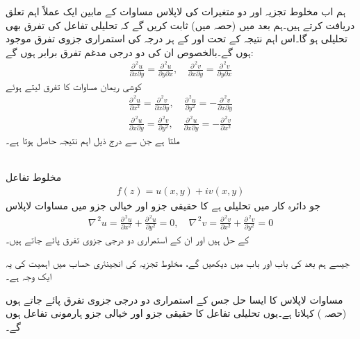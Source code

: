 ہم اب مخلوط تجزیہ اور دو متغیرات کی لاپلاس مساوات کے مابین ایک عملاً اہم تعلق دریافت کرتے ہیں۔ہم بعد میں (حصہ  میں)  ثابت کریں گے کہ تحلیلی تفاعل  کی تفرق بھی تحلیلی ہو گا۔اس اہم نتیجہ کے تحت  اور  کے ہر درجہ کی استمراری جزوی تفرق موجود ہوں گے۔بالخصوص ان کی دو درجی مدغم تفرق برابر ہوں گے:
\begin{align*}
\frac{\partial^{\,2}u}{\partial x\partial y}=\frac{\partial^{\,2}u}{\partial y\partial x},\quad\frac{\partial^{\,2}v}{\partial x\partial y}=\frac{\partial^{\,2}v}{\partial y\partial x}
\end{align*}
کوشی ریمان مساوات کا تفرق لیتے ہوئے
\begin{align*}
\frac{\partial^{\,2}u}{\partial x^2}=\frac{\partial^{\,2}v}{\partial x\partial y},\quad \frac{\partial^{\,2}u}{\partial y^2}=-\frac{\partial^{\,2}v}{\partial x\partial y}\\
\frac{\partial^{\,2}u}{\partial x\partial y}=\frac{\partial^{\,2}v}{\partial y^2},\quad \frac{\partial^{\,2}u}{\partial x\partial y}=-\frac{\partial^{\,2}v}{\partial x^2}
\end{align*}
ملتا ہے جن سے درج ذیل اہم نتیجہ حاصل ہوتا ہے۔

\quad {}\\
مخلوط تفاعل
\begin{align*}
f(z)=u(x,y)+iv(x,y)
\end{align*}
جو  دائرہ کار  میں تحلیلی ہے کا حقیقی جزو اور  خیالی جزو    میں مساوات لاپلاس
\begin{align*}
\nabla^{\,2}u=\frac{\partial^{\,2}u}{\partial x^2}+\frac{\partial^{\,2}u}{\partial y^2}=0,\quad \nabla^{\,2}v=\frac{\partial^{\,2}v}{\partial x^2}+\frac{\partial^{\,2}v}{\partial y^2}=0
\end{align*}
کے حل ہیں اور ان کے استمراری دو درجی جزوی تفرق پائے جاتے ہیں۔

جیسے ہم بعد کی باب  اور باب  میں دیکھیں گے، مخلوط تجزیہ کی انجینئری  حساب میں اہمیت کی یہ ایک وجہ ہے۔

مساوات لاپلاس کا ایسا حل جس کے استمراری دو درجی جزوی تفرق پائے جاتے ہوں   (حصہ ) کہلاتا ہے۔یوں تحلیلی تفاعل کا حقیقی  جزو اور خیالی جزو ہارمونی تفاعل ہوں گے۔


